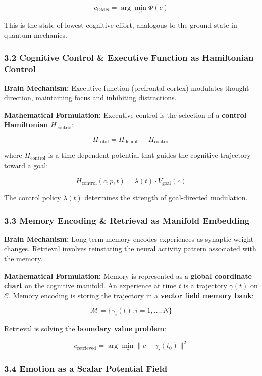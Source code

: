 \documentclass[
  11pt,
  a4paper,
]{article}
\begin{document}
\[c_{\text{DMN}} = \arg\min_{c} \Phi(c)\]

This is the state of lowest cognitive effort, analogous to the ground
state in quantum mechanics.

\subsubsection{3.2 Cognitive Control \& Executive Function as
Hamiltonian
Control}\label{cognitive-control-executive-function-as-hamiltonian-control}

\textbf{Brain Mechanism:} Executive function (prefrontal cortex)
modulates thought direction, maintaining focus and inhibiting
distractions.

\textbf{Mathematical Formulation:} Executive control is the selection of
a \textbf{control Hamiltonian} \(H_{\text{control}}\):

\[H_{\text{total}} = H_{\text{default}} + H_{\text{control}}\]

where \(H_{\text{control}}\) is a time-dependent potential that guides
the cognitive trajectory toward a goal:

\[H_{\text{control}}(c, p, t) = \lambda(t) \cdot V_{\text{goal}}(c)\]

The control policy \(\lambda(t)\) determines the strength of
goal-directed modulation.

\subsubsection{3.3 Memory Encoding \& Retrieval as Manifold
Embedding}\label{memory-encoding-retrieval-as-manifold-embedding}

\textbf{Brain Mechanism:} Long-term memory encodes experiences as
synaptic weight changes. Retrieval involves reinstating the neural
activity pattern associated with the memory.

\textbf{Mathematical Formulation:} Memory is represented as a
\textbf{global coordinate chart} on the cognitive manifold. An
experience at time \(t\) is a trajectory \(\gamma(t)\) on
\(\mathcal{C}\). Memory encoding is storing the trajectory in a
\textbf{vector field memory bank}:

\[\mathcal{M} = \{\gamma_i(t) : i = 1, \dots, N\}\]

Retrieval is solving the \textbf{boundary value problem}:

\[c_{\text{retrieved}} = \arg\min_{c} \|c - \gamma_i(t_0)\|^2\]

\subsubsection{3.4 Emotion as a Scalar Potential
Field}\label{emotion-as-a-scalar-potential-field}
\end{document}

